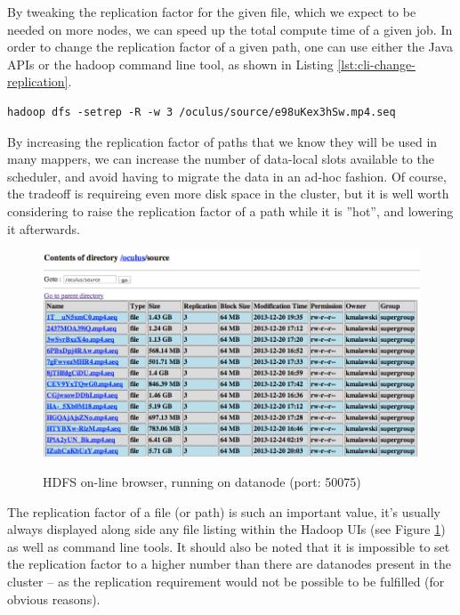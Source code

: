 By tweaking the replication factor for the given file, which we expect to be needed on more nodes, we can speed up the total compute time of a given job. In order to change the replication factor of a given path, one can use either the Java APIs or the hadoop command line tool, as shown in Listing \ref{lst:cli-change-replication}.

\begin{lstlisting}[caption={Explicitly changing the replication factor on a path using command line tools}, label={lst:cli-change-replication}]
hadoop dfs -setrep -R -w 3 /oculus/source/e98uKex3hSw.mp4.seq
\end{lstlisting}

By increasing the replication factor of paths that we know they will be used in many mappers, we can increase the number of data-local slots available to the scheduler, and avoid having to migrate the data in an ad-hoc fashion. Of course, the tradeoff is requireing even more disk space in the cluster, but it is well worth considering to raise the replication factor of a path while it is ''hot'', and lowering it afterwards.

\begin{figure}
  \centering
  \includegraphics[width=\textwidth]{img/hadoop/hdfs_show-replication}
  \label{fig:hdfs-replication-factors}
  \caption{HDFS on-line browser, running on datanode (port: 50075)}
\end{figure}

The replication factor of a file (or path) is such an important value, it's usually always displayed along side any file listing within the Hadoop UIs (see Figure \ref{fig:hdfs-replication-factors}) as well as command line tools. It should also be noted that it is impossible to set the replication factor to a higher number than there are datanodes present in the cluster -- as the replication requirement would not be possible to be fulfilled (for obvious reasons).


